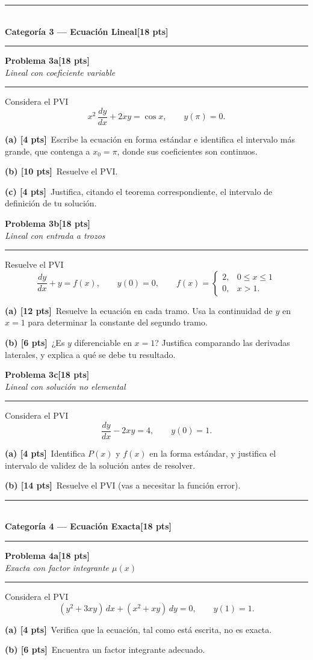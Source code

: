 \documentclass[11pt,letterpaper]{article}
\newcommand{\categoria}[3]{%
  \bigskip\bigskip\noindent
  \rule{\linewidth}{0.8pt}\\[2pt]
  {\Large\bfseries Categoría #1 --- #2}\hfill\textbf{[#3 pts]}\\[2pt]
  \rule{\linewidth}{0.8pt}\vspace{4pt}
}
\newcommand{\problema}[3]{%
  \bigskip\noindent
  {\large\textbf{Problema #1}}\hfill\textbf{[#2 pts]}\\[3pt]
  {\small\itshape #3}\par
  \vspace{2pt}\hrule\vspace{8pt}
}
\newcommand{\subparte}[2]{%
  \medskip\noindent\textbf{(#1}\ #2\par
}
\begin{document}
\newpage
\categoria{3}{Ecuación Lineal}{18}

\problema{3a}{18}{Lineal con coeficiente variable}

Considera el PVI
\[
x^2\,\frac{dy}{dx} + 2xy = \cos x, \qquad y(\pi)=0.
\]

\subparte{a) [4 pts]}{Escribe la ecuación en forma estándar e identifica el intervalo más grande, que contenga a $x_0=\pi$, donde sus coeficientes son continuos.}

\subparte{b) [10 pts]}{Resuelve el PVI.}

\subparte{c) [4 pts]}{Justifica, citando el teorema correspondiente, el intervalo de definición de tu solución.}

\problema{3b}{18}{Lineal con entrada a trozos}

Resuelve el PVI
\[
\frac{dy}{dx} + y = f(x), \qquad y(0)=0, \qquad
f(x) = \begin{cases} 2, & 0 \le x \le 1 \\ 0, & x > 1. \end{cases}
\]

\subparte{a) [12 pts]}{Resuelve la ecuación en cada tramo. Usa la continuidad de $y$ en $x=1$ para determinar la constante del segundo tramo.}

\subparte{b) [6 pts]}{¿Es $y$ diferenciable en $x=1$? Justifica comparando las derivadas laterales, y explica a qué se debe tu resultado.}

\problema{3c}{18}{Lineal con solución no elemental}

Considera el PVI
\[
\frac{dy}{dx} - 2xy = 4, \qquad y(0)=1.
\]

\subparte{a) [4 pts]}{Identifica $P(x)$ y $f(x)$ en la forma estándar, y justifica el intervalo de validez de la solución antes de resolver.}

\subparte{b) [14 pts]}{Resuelve el PVI (vas a necesitar la función error).}

\categoria{4}{Ecuación Exacta}{18}

\problema{4a}{18}{Exacta con factor integrante $\mu(x)$}

Considera el PVI
\[
(y^2+3xy)\,dx + (x^2+xy)\,dy = 0, \qquad y(1)=1.
\]

\subparte{a) [4 pts]}{Verifica que la ecuación, tal como está escrita, no es exacta.}

\subparte{b) [6 pts]}{Encuentra un factor integrante adecuado.}
\end{document}
